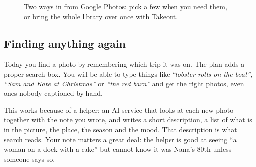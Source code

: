 \documentclass[11pt,a4paper]{article}
\begin{document}
\begin{figure}[H]
  \centering
  \caption{Two ways in from Google Photos: pick a few when you need them, or bring the whole library over once with Takeout.}
\end{figure}

\subsection{Finding anything again}

Today you find a photo by remembering which trip it was on. The plan adds a proper search box. You will be able to type things like \emph{``lobster rolls on the boat''}, \emph{``Sam and Kate at Christmas''} or \emph{``the red barn''} and get the right photos, even ones nobody captioned by hand.

This works because of a helper: an AI service that looks at each new photo together with the note you wrote, and writes a short description, a list of what is in the picture, the place, the season and the mood. That description is what search reads. Your note matters a great deal: the helper is good at seeing ``a woman on a dock with a cake'' but cannot know it was Nana's 80th unless someone says so.
\end{document}
